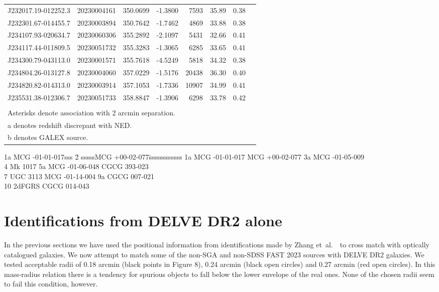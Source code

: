 \documentclass{article}
\newcommand{\etal}{\mbox{\rm{et al.}~~}}
\begin{document}
\begin {longtable}{|l|l|r|r|r|r|r|l|}
 J232017.19-012252.3&  20230004161&  350.0699&   -1.3800&  7593& 35.89& 0.38&\\
 J232301.67-014455.7&  20230003894&  350.7642&   -1.7462&  4869& 33.88& 0.38&\\
 J234107.93-020634.7&  20230060306&  355.2892&   -2.1097&  5431& 32.66& 0.41&\\
 J234117.44-011809.5&  20230051732&  355.3283&   -1.3065&  6285& 33.65& 0.41&\\
 J234300.79-043113.0&  20230001571&  355.7618&   -4.5249&  5818& 34.32& 0.38&\\
 J234804.26-013127.8&  20230004060&  357.0229&   -1.5176& 20438& 36.30& 0.40&\\
 J234820.82-014313.0&  20230003914&  357.1053&   -1.7336& 10907& 34.99& 0.41&\\
 J235531.38-012306.7&  20230051733&  358.8847&   -1.3906&  6298& 33.78& 0.42&\\
\\
\multicolumn{8}{l}{Asterisks denote association with 2 arcmin separation.}\\
\multicolumn{8}{l}{a denotes redshift discrepant with NED.}\\
\multicolumn{8}{l}{b denotes GALEX source.}\\
\end{longtable}
\begin{tabbing}
1a MCG -01-01-017sss \= 2 sssssMCG +00-02-077\= ssssssssssss\kill
1a MCG -01-01-017  MCG +00-02-077\>
3a MCG -01-05-009 \\ 4 Mk 1017\>
5a MCG -01-06-048  CGCG 393-023\\
7 UGC 3113         MCG -01-14-004\>
9a CGCG 007-021   \\ 10 2dFGRS CGCG 014-043\\
\end{tabbing}
\section{Identifications from DELVE DR2 alone}
In the previous sections we have used the positional information from identifications made by Zhang \etal to cross
match with optically catalogued galaxies. We now attempt to match some of the non-SGA and non-SDSS FAST 2023 sources
with DELVE DR2 galaxies.
We tested acceptable radii of 0.18 arcmin (black points in Figure 8), 0.24 arcmin (black open circles) and 0.27 arcmin (red open circles). In this mass-radius relation there is a tendency for spurious objects to fall below the lower envelope of the real ones. None of the chosen radii seem to fail this condition, however.
\end{document}
